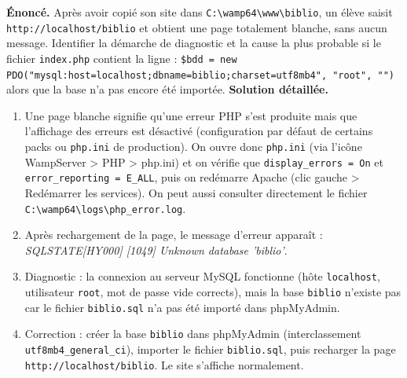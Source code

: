\documentclass[11pt]{article}
\begin{document}
\begin{exoresolu}
\textbf{Énoncé.} Après avoir copié son site dans \texttt{C:\textbackslash wamp64\textbackslash www\textbackslash biblio}, un élève saisit \texttt{http://localhost/biblio} et obtient une page totalement blanche, sans aucun message. Identifier la démarche de diagnostic et la cause la plus probable si le fichier \texttt{index.php} contient la ligne : \texttt{\$bdd = new PDO("mysql:host=localhost;dbname=biblio;charset=utf8mb4", "root", "")} alors que la base n'a pas encore été importée.
\tcblower
\textbf{Solution détaillée.}
\begin{enumerate}
  \item Une page blanche signifie qu'une erreur PHP s'est produite mais que l'affichage des erreurs est désactivé (configuration par défaut de certains packs ou \texttt{php.ini} de production). On ouvre donc \texttt{php.ini} (via l'icône WampServer > PHP > php.ini) et on vérifie que \texttt{display\_errors = On} et \texttt{error\_reporting = E\_ALL}, puis on redémarre Apache (clic gauche > Redémarrer les services). On peut aussi consulter directement le fichier \texttt{C:\textbackslash wamp64\textbackslash logs\textbackslash php\_error.log}.
  \item Après rechargement de la page, le message d'erreur apparaît : \emph{SQLSTATE[HY000] [1049] Unknown database 'biblio'}.
  \item Diagnostic : la connexion au serveur MySQL fonctionne (hôte \texttt{localhost}, utilisateur \texttt{root}, mot de passe vide corrects), mais la base \texttt{biblio} n'existe pas car le fichier \texttt{biblio.sql} n'a pas été importé dans phpMyAdmin.
  \item Correction : créer la base \texttt{biblio} dans phpMyAdmin (interclassement \texttt{utf8mb4\_general\_ci}), importer le fichier \texttt{biblio.sql}, puis recharger la page \texttt{http://localhost/biblio}. Le site s'affiche normalement.
\end{enumerate}
\end{exoresolu}
\end{document}
